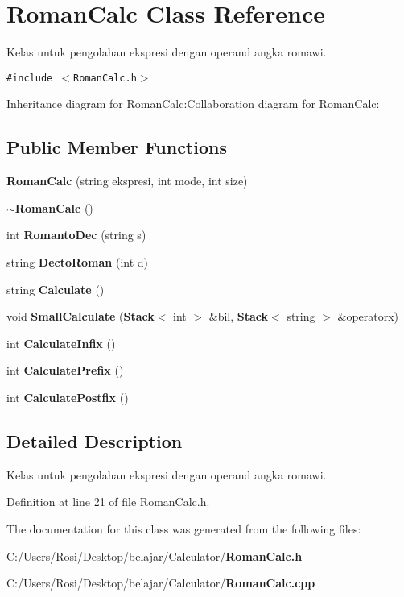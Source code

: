 \section{Roman\-Calc Class Reference}
\label{class_roman_calc}
Kelas untuk pengolahan ekspresi dengan operand angka romawi.  


{\tt \#include $<$Roman\-Calc.h$>$}

Inheritance diagram for Roman\-Calc:Collaboration diagram for Roman\-Calc:\subsection*{Public Member Functions}
\begin{CompactItemize}
\item 
{\bf Roman\-Calc} (string ekspresi, int mode, int size)\label{class_roman_calc_98bbd4d6af013fbb7f7f5e282c0057ec}

\item 
{\bf $\sim$Roman\-Calc} ()\label{class_roman_calc_f7ab50c87dc838fdc30f1622d55948fd}

\item 
int {\bf Romanto\-Dec} (string s)\label{class_roman_calc_24cf3d90b3810d31bbde7af678eb8f9e}

\item 
string {\bf Decto\-Roman} (int d)\label{class_roman_calc_907493780cf78dc8e85d999c1a7d5556}

\item 
string {\bf Calculate} ()\label{class_roman_calc_ef3b608a0cfab3929e1afe02afe9e580}

\item 
void {\bf Small\-Calculate} ({\bf Stack}$<$ int $>$ \&bil, {\bf Stack}$<$ string $>$ \&operatorx)\label{class_roman_calc_0f8f717719f6e76b6680f44bd81bbd9f}

\item 
int {\bf Calculate\-Infix} ()\label{class_roman_calc_39a440cd99043f8ef3809d8191620779}

\item 
int {\bf Calculate\-Prefix} ()\label{class_roman_calc_968d7f0f8876ad0fb9a25576e0f0e7c6}

\item 
int {\bf Calculate\-Postfix} ()\label{class_roman_calc_81d5c7f43d3de276cafd11096ec6204c}

\end{CompactItemize}


\subsection{Detailed Description}
Kelas untuk pengolahan ekspresi dengan operand angka romawi. 



Definition at line 21 of file Roman\-Calc.h.

The documentation for this class was generated from the following files:\begin{CompactItemize}
\item 
C:/Users/Rosi/Desktop/belajar/Calculator/{\bf Roman\-Calc.h}\item 
C:/Users/Rosi/Desktop/belajar/Calculator/{\bf Roman\-Calc.cpp}\end{CompactItemize}
